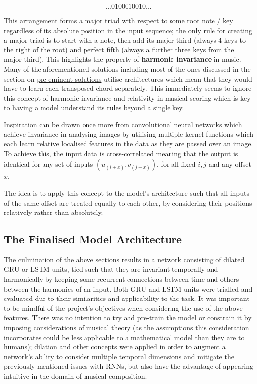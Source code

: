 \documentclass[12pt,]{article}
\begin{document}
\[... 0100010010 ...\]

This arrangement forms a major triad with respect to some root note /
key regardless of its absolute position in the input sequence; the only
rule for creating a major triad is to start with a note, then add its
major third (always 4 keys to the right of the root) and perfect fifth
(always a further three keys from the major third). This highlights the
property of \textbf{harmonic invariance} in music. Many of the
aforementioned solutions including most of the ones discussed in the
section on \protect\hyperlink{competitiveexistingsolutions}{pre-eminent
solutions} utilise architectures which mean that they would have to
learn each transposed chord separately. This immediately seems to ignore
this concept of harmonic invariance and relativity in musical scoring
which is key to having a model understand its rules beyond a single key.

Inspiration can be drawn once more from convolutional neural networks
which achieve invariance in analysing images by utilising multiple
kernel functions which each learn relative localised features in the
data as they are passed over an image. To achieve this, the input data
is cross-correlated meaning that the output is identical for any set of
inputs \((u_{(i + x)}, v_{(j+x)})\), for all fixed \(i,j\) and any
offset \(x\).

The idea is to apply this concept to the model's architecture such that
all inputs of the same offset are treated equally to each other, by
considering their positions relatively rather than absolutely.

\hypertarget{the-finalised-model-architecture}{%
\subsection{The Finalised Model
Architecture}\label{the-finalised-model-architecture}}

The culmination of the above sections results in a network consisting of
dilated GRU or LSTM units, tied such that they are invariant temporally
and harmonically by keeping some recurrent connections between time and
others between the harmonics of an input. Both GRU and LSTM units were
trialled and evaluated due to their similarities and applicability to
the task. It was important to be mindful of the project's objectives
when considering the use of the above features. There was no intention
to try and pre-train the model or constrain it by imposing
considerations of musical theory (as the assumptions this consideration
incorporates could be less applicable to a mathematical model than they
are to humans); dilation and other concepts were applied in order to
augment a network's ability to consider multiple temporal dimensions and
mitigate the previously-mentioned issues with RNNs, but also have the
advantage of appearing intuitive in the domain of musical composition.
\end{document}
